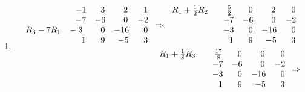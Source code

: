 \documentclass[12pt]{amsart}
\begin{document}
\begin{enumerate}
\begin{enumerate}
			\item 
			\begin{align}
				\begin{array}{cccc}
					\hspace{2.2cm} -1 &\text{ } \text{ }3 &\text{ } \text{ } \text{ }2 &\text{ } \text{ }1 \\
					\hspace{2.2cm} -7 &-6 &\text{ } \text{ } \text{ }0 &-2 \\
					R_3-7R_1 \hspace{0.3cm} -3 &\text{ } \text{ }0 &-16 &\text{ } \text{ }0 \\
					\hspace{2.2cm} \text{ } \text{ }1 &\text{ } \text{ }9 &\hspace{0.15cm}-5 &\text{ } \text{ }3
				\end{array} \Rightarrow
				\begin{array}{cccc}
					R_1+\frac{1}{2}R_2 \hspace{0.3cm} \text{ } \text{ } \text{ } \text{ } \frac{5}{2} 
					&\text{ } \text{ }0 & \text{ } \text{ } \text{ }2 &\text{ } \text{ }0 \\
					\hspace{2.2cm} -7 &-6 &\text{ } \text{ } \text{ }0 &-2 \\
					\hspace{2.2cm} -3 &\text{ } \text{ }0 &-16 &\text{ } \text{ }0 \\
					\hspace{2.2cm} \text{ } \text{ }1 &\text{ } \text{ }9 &\hspace{0.15cm}-5 &\text{ } \text{ }3
				\end{array} \notag \\
				\begin{array}{cccc}
					R_1+\frac{1}{8}R_3 \hspace{0.3cm} \text{ } \text{ } \text{ } \text{ } \frac{17}{8} 
					&\text{ } \text{ }0 & \text{ } \text{ } \text{ }0 &\text{ } \text{ }0 \\
					\hspace{2.2cm} -7 &-6 &\text{ } \text{ } \text{ }0 &-2 \\
					\hspace{2.2cm} -3 &\text{ } \text{ }0 &-16 &\text{ } \text{ }0 \\
					\hspace{2.2cm} \text{ } \text{ }1 &\text{ } \text{ }9 &\hspace{0.15cm}-5 &\text{ } \text{ }3
				\end{array} \Rightarrow

\end{align}
\end{enumerate}
\end{enumerate}
\end{document}
